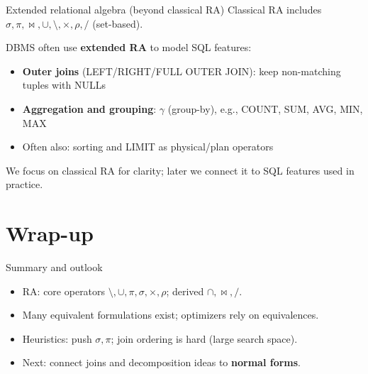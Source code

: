 \documentclass[10pt,aspectratio=169]{beamer}
\newcommand{\select}{\sigma}
\newcommand{\proj}{\pi}
\newcommand{\rename}{\rho}
\begin{document}
\begin{frame}{Extended relational algebra (beyond classical RA)}
Classical RA includes \(\sigma,\pi,\Join,\cup,\setminus,\times,\rho,/\) (set-based).

\vspace{0.4em}
DBMS often use \textbf{extended RA} to model SQL features:
\begin{itemize}
  \item \textbf{Outer joins} (LEFT/RIGHT/FULL OUTER JOIN): keep non-matching tuples with NULLs
  \item \textbf{Aggregation and grouping}: \(\gamma\) (group-by), e.g., COUNT, SUM, AVG, MIN, MAX
  \item Often also: sorting and LIMIT as physical/plan operators
\end{itemize}

\vspace{0.4em}
\small We focus on classical RA for clarity; later we connect it to SQL features used in practice.
\end{frame}

\section{Wrap-up}

\begin{frame}{Summary and outlook}
\begin{itemize}
  \item RA: core operators \(\setminus,\cup,\proj,\select,\times,\rename\); derived \(\cap,\Join,/\).
  \item Many equivalent formulations exist; optimizers rely on equivalences.
  \item Heuristics: push \(\sigma,\pi\); join ordering is hard (large search space).
  \item Next: connect joins and decomposition ideas to \textbf{normal forms}.
\end{itemize}
\end{frame}



\end{document}
